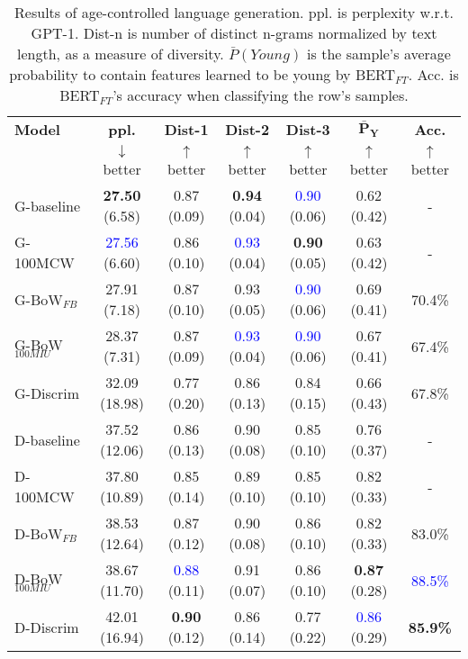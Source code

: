 \begin{table*}[h]
    \centering
    \begin{tabular}{l | c c c c | c c}
    \toprule
    \textbf{Model} & \textbf{ppl.} & \textbf{Dist-1} & \textbf{Dist-2} & \textbf{Dist-3} & $\boldsymbol{\bar{P}_Y}$ & \textbf{Acc.}\\
     & $\downarrow$ better & $\uparrow$ better & $\uparrow$ better & $\uparrow$ better & $\uparrow$ better & $\uparrow$ better\\
    \midrule
    \midrule
    G-baseline & \textbf{27.50} (6.58) & 0.87 (0.09) & \textbf{0.94} (0.04) & \textcolor{blue}{0.90} (0.06) & 0.62 (0.42) & -\\
    G-100MCW & \textcolor{blue}{27.56} (6.60) & 0.86 (0.10) & \textcolor{blue}{0.93} (0.04) & \textbf{0.90} (0.05) & 0.63 (0.42) & -\\
    \midrule
    G-BoW$_{FB}$ & 27.91 (7.18) & 0.87 (0.10) & 0.93 (0.05) & \textcolor{blue}{0.90} (0.06) & 0.69 (0.41) & 70.4\%\\
    G-BoW$_{100MIU}$ & 28.37 (7.31) & 0.87 (0.09) & \textcolor{blue}{0.93} (0.04) & \textcolor{blue}{0.90} (0.06) & 0.67 (0.41) & 67.4\%\\
    \midrule
    G-Discrim & 32.09 (18.98) & 0.77 (0.20) & 0.86 (0.13) & 0.84 (0.15) & 0.66 (0.43) & 67.8\%\\
    \midrule
    \midrule
    D-baseline & 37.52 (12.06) & 0.86 (0.13) & 0.90 (0.08) & 0.85 (0.10) & 0.76 (0.37) & -\\
    D-100MCW & 37.80 (10.89) & 0.85 (0.14) & 0.89 (0.10) & 0.85 (0.10) & 0.82 (0.33) & -\\
    \midrule
    D-BoW$_{FB}$ & 38.53 (12.64) & 0.87 (0.12) & 0.90 (0.08) & 0.86 (0.10) & 0.82 (0.33) & 83.0\%\\
    D-BoW$_{100MIU}$ & 38.67 (11.70) & \textcolor{blue}{0.88} (0.11) & 0.91 (0.07) & 0.86 (0.10) & \textbf{0.87} (0.28) & \textcolor{blue}{88.5\%}\\
    \midrule
    D-Discrim & 42.01 (16.94) & \textbf{0.90} (0.12) & 0.86 (0.14) & 0.77 (0.22) & \textcolor{blue}{0.86} (0.29) & \textbf{85.9\%}\\
    \bottomrule
    \end{tabular}
    \caption{ Results of age-controlled language generation. ppl. is perplexity w.r.t. GPT-1. Dist-n is number of distinct n-grams normalized by text length, as a measure of diversity. $\bar{P}(Young)$ is the sample's average probability to contain features learned to be young by BERT$_{FT}$. Acc. is BERT$_{FT}$'s accuracy when classifying the row's samples.}
    \label{tab:ctg_results_ws_neutral_prompt_young_models}
\end{table*}

